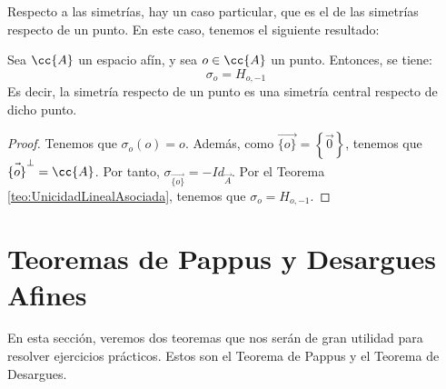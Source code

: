 Respecto a las simetrías, hay un caso particular, que es el de las simetrías respecto de un punto. En este caso, tenemos el siguiente resultado:
\begin{prop}\label{lema:SimetriaCentral}
    Sea $\cc{A}$ un espacio afín, y sea $o\in \cc{A}$ un punto. Entonces, se tiene:
    \begin{equation*}
        \sigma_{o} = H_{o,-1}
    \end{equation*}
    Es decir, la simetría respecto de un punto es una simetría central respecto de dicho punto.
\end{prop}
\begin{proof}
    Tenemos que $\sigma_{o}(o) = o$. Además, como $\vec{\{o\}} = \left\{\vec{0}\right\}$, tenemos que $\vec{\{o\}}^\perp=\cc{A}$. Por tanto,
    $\sigma_{\vec{\{o\}}}=-Id_{\vec{A}}$. Por el Teorema \ref{teo:UnicidadLinealAsociada}, tenemos que $\sigma_{o} = H_{o,-1}$.
\end{proof}




\section{Teoremas de Pappus y Desargues Afines}\label{sec:TeoremasPappusDesarguesAfines}
En esta sección, veremos dos teoremas que nos serán de gran utilidad para resolver ejercicios prácticos. Estos son el Teorema de Pappus y el Teorema de Desargues.

